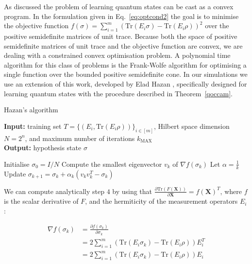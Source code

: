 \documentclass[aps,superscriptaddress,nofootinbib,twocolumn]{revtex4-1}
\begin{document}
\begin{widetext}
As discussed the problem of learning quantum states can be cast as a convex program. In the formulation given in Eq.~\ref{eq:optcond2} the goal is to minimise the objective function $f(\sigma) =  \sum^m _{i=1} (\mathrm{Tr}(E_i\sigma) - \mathrm{Tr}(E_i\rho))^2$ over the positive semidefinite matrices of unit trace. Because both the space of positive semidefinite matrices of unit trace and the objective function are convex, we are dealing with a constrained convex optimisation problem. A polynomial time algorithm for this class of problems is the Frank-Wolfe algorithm \cite{frank1956algorithm} for optimising a single function over the bounded positive semidefinite cone. In our simulations we use an extension of this work, developed by Elad Hazan \cite{hazan2008sparse}, specifically designed for learning quantum states with the procedure described in Theorem~\ref{qoccam}.

\begin{algorithm}[H]
\label{Hazan}
\caption{Hazan's algorithm}
\textbf{Input:} training set $T=\{(E_i,\mathrm{Tr}(E_i\rho))\}_{i\in[m]}$, Hilbert space dimension $N=2^n$, and maximum number of iterations $k_{\mathrm{MAX}}$  \\
\textbf{Output:} hypothesis state $\sigma$ \\
\begin{algorithmic}[1]
\State Initialise $\sigma_0 = I/N$
\Begin
\State Compute the smallest eigenvector $v_k$ of $\nabla f(\sigma_k)$
\State Let $\alpha = \frac{1}{k}$
\State Update $\sigma_{k+1} = \sigma_k + \alpha_k(v_k v_k ^T - \sigma_k)$
\End
\end{algorithmic}
\end{algorithm}

We can compute analytically step $4$ by using that $\frac{\partial \mathrm{Tr}(F(\mathbf{X}))}{\partial \mathbf{X}} = f(\mathbf{X})^T$, where $f$ is the scalar derivative of $F$, and the hermiticity of the measurement operators $E_i$:

\begin{equation*} 
\begin{split}
\nabla f(\sigma_k) & = \frac{\partial f(\sigma_k) }{\partial \sigma_k} \\
 & = 2 \sum_{i=1} ^m (\mathrm{Tr}(E_i \sigma_k) - \mathrm{Tr}(E_i\rho))E_i^T \\
 & = 2 \sum_{i=1} ^m (\mathrm{Tr}(E_i \sigma_k) - \mathrm{Tr}(E_i\rho))E_i
\end{split}
\end{equation*}


\end{widetext}
\end{document}
